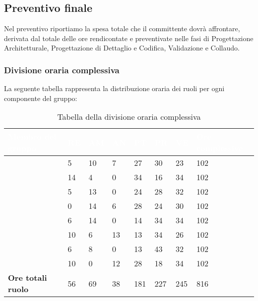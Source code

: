 \subsection{Preventivo finale} 
Nel preventivo riportiamo la spesa totale che il committente dovrà affrontare, derivata dal totale delle ore rendicontate e preventivate nelle fasi di Progettazione Architetturale, Progettazione di Dettaglio e Codifica, Validazione e Collaudo.

\subsubsection{Divisione oraria complessiva} 
La seguente tabella rappresenta la distribuzione oraria dei ruoli per ogni componente del gruppo:
{
\renewcommand{\arraystretch}{2}
\begin{longtable}[h!] { C{4cm} C{1cm} C{1cm} C{1cm} C{1cm} C{1cm} C{1cm} C{3cm}}
\caption{Tabella della divisione oraria complessiva}\\

\textcolor{white}{\textbf{Membro del gruppo}} & 
\textcolor{white}{\textbf{RE}} & 
\textcolor{white}{\textbf{AM}} & 
\textcolor{white}{\textbf{AN}} & 
\textcolor{white}{\textbf{PT}} & 
\textcolor{white}{\textbf{PR}} & 
\textcolor{white}{\textbf{VE}} & 
\textcolor{white}{\textbf{Ore complessive}}\\	
\endhead
        
\MC{}                     &  5 & 10 &  7 &  27 &  30 &  23 & 102 \\
\LD{}                     & 14 &  4 &  0 &  34 &  16 &  34 & 102 \\
\CE{}                     &  5 & 13 &  0 &  24 &  28 &  32 & 102 \\
\SE{}                     &  0 & 14 &  6 &  28 &  24 &  30 & 102 \\
\PF{}                     &  6 & 14 &  0 &  14 &  34 &  34 & 102 \\
\DF{}                     & 10 &  6 & 13 &  13 &  34 &  26 & 102 \\
\BR{}                     &  6 &  8 &  0 &  13 &  43 &  32 & 102 \\
\AT{}                     & 10 &  0 & 12 &  28 &  18 &  34 & 102 \\
\textbf{Ore totali ruolo} & 56 & 69 & 38 & 181 & 227 & 245 & 816 \\

\end{longtable}
}

